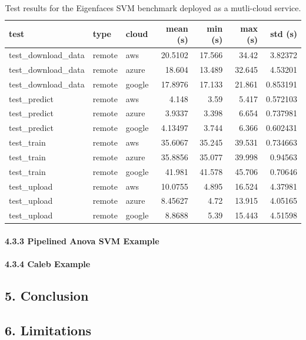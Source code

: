 \begin{table}[htb]
\caption{Test results for the Eigenfaces SVM benchmark deployed
  as a mutli-cloud service.}
\label{tabe:3}

\begin{tabular}[]{@{}lllrrrr@{}}
\toprule
test & type & cloud & mean (s) & min (s) & max (s) & std
(s)\tabularnewline
\midrule
test\_download\_data & remote & aws & 20.5102 & 17.566 & 34.42 &
3.82372\tabularnewline
test\_download\_data & remote & azure & 18.604 & 13.489 & 32.645 &
4.53201\tabularnewline
test\_download\_data & remote & google & 17.8976 & 17.133 & 21.861 &
0.853191\tabularnewline
test\_predict & remote & aws & 4.148 & 3.59 & 5.417 &
0.572103\tabularnewline
test\_predict & remote & azure & 3.9337 & 3.398 & 6.654 &
0.737981\tabularnewline
test\_predict & remote & google & 4.13497 & 3.744 & 6.366 &
0.602431\tabularnewline
test\_train & remote & aws & 35.6067 & 35.245 & 39.531 &
0.734663\tabularnewline
test\_train & remote & azure & 35.8856 & 35.077 & 39.998 &
0.94563\tabularnewline
test\_train & remote & google & 41.981 & 41.578 & 45.706 &
0.70646\tabularnewline
test\_upload & remote & aws & 10.0755 & 4.895 & 16.524 &
4.37981\tabularnewline
test\_upload & remote & azure & 8.45627 & 4.72 & 13.915 &
4.05165\tabularnewline
test\_upload & remote & google & 8.8688 & 5.39 & 15.443 &
4.51598\tabularnewline
\bottomrule
\end{tabular}
\end{table}

\hypertarget{pipelined-anova-svm-example}{%
\paragraph{4.3.3 Pipelined Anova SVM
Example}\label{pipelined-anova-svm-example}}

\hypertarget{caleb-example}{%
\paragraph{4.3.4 Caleb Example}\label{caleb-example}}

\hypertarget{conclusion}{%
\subsection{5. Conclusion}\label{conclusion}}

\hypertarget{limitations}{%
\subsection{6. Limitations}\label{limitations}}

